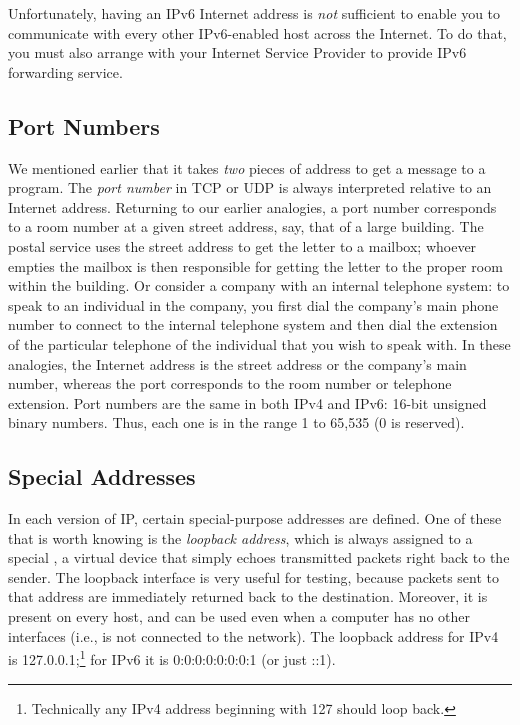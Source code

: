 
%
Unfortunately, having an IPv6 Internet address
is \emph{not\/} sufficient to enable you to communicate with every
other IPv6-enabled host across the Internet.  To do that, you must also
arrange with your Internet Service Provider to provide IPv6 forwarding
service.

\subsection{Port Numbers}

We mentioned earlier that it takes \emph{two\/} pieces of address to
get a message to a program.
The \emph{port number\/} in TCP or UDP is always interpreted relative to an
Internet address.
Returning to our earlier analogies, a port number
corresponds to a room number at a given street address, say, that of a
large building.  The postal service uses the street address to get the
letter to a mailbox; whoever empties the mailbox is then responsible
for getting the letter to the proper room within the building. Or
consider a company with an internal telephone system: to speak to an
individual in the company, you first dial the company's main phone
number to connect to the internal telephone system and then dial the
extension of the particular telephone of the individual that you wish
to speak with.  In these analogies, the Internet address is the street
address or the company's main number, whereas the port corresponds to
the room number or telephone extension.  Port numbers are the same in
both IPv4 and IPv6: 16-bit
unsigned binary numbers. Thus, each one is in the range 1 to 65,535 (0 is
reserved).

\subsection{Special Addresses}

In each version of IP, certain special-purpose addresses are defined.
One of these that is worth knowing is the \emph{loopback address},
which is always assigned to a special , a virtual device
that simply echoes transmitted packets right back to the
sender.  The loopback interface is very useful for testing, because
packets sent to that address are immediately returned back to the
destination.  Moreover, it is present on every host, and can be
used even when a computer has no other interfaces (i.e.,
is not connected to the network).
The loopback address for IPv4 is 127.0.0.1;\footnote{Technically
any IPv4 address beginning with 127 should loop back.}
for IPv6 it is 0:0:0:0:0:0:0:1 (or just ::1).

